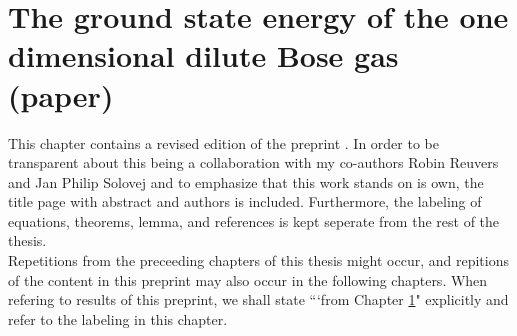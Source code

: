 \chapter{The ground state energy of the one dimensional dilute Bose gas (paper)}\label{ChapterTheGroundStateEnergyOfTheOneDimensionalDiluteBoseGas}
This chapter contains a revised edition of the preprint \cite{agerskov2022ground}. In order to be transparent about this being a collaboration with my co-authors Robin Reuvers and Jan Philip Solovej and to emphasize that this work stands on is own, the title page with abstract and authors is included. Furthermore, the labeling of equations, theorems, lemma, and references is kept seperate from the rest of the thesis.\\
Repetitions from the preceeding chapters of this thesis might occur, and repitions of the content in this preprint may also occur in the following chapters. When refering to results of this preprint, we shall state ```from Chapter \ref{ChapterTheGroundStateEnergyOfTheOneDimensionalDiluteBoseGas}" explicitly and refer to the labeling in this chapter.


